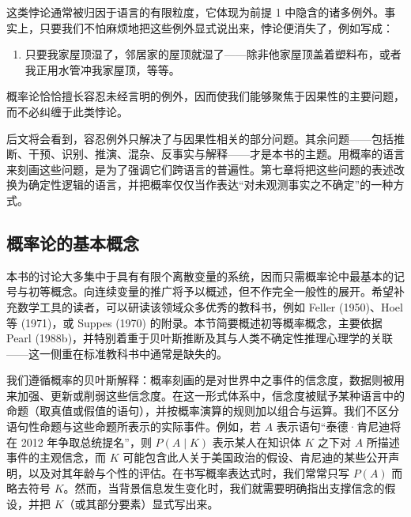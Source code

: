 这类悖论通常被归因于语言的有限粒度，它体现为前提 1 中隐含的诸多例外。事实上，只要我们不怕麻烦地把这些例外显式说出来，悖论便消失了，例如写成：

\begin{enumerate}[label=\arabic*$^{*}$.]
\item 只要我家屋顶湿了，邻居家的屋顶就湿了——除非他家屋顶盖着塑料布，或者我正用水管冲我家屋顶，等等。
\end{enumerate}

概率论恰恰擅长容忍未经言明的例外，因而使我们能够聚焦于因果性的主要问题，而不必纠缠于此类悖论。

后文将会看到，容忍例外只解决了与因果性相关的部分问题。其余问题——包括推断、干预、识别、推演、混杂、反事实与解释——才是本书的主题。用概率的语言来刻画这些问题，是为了强调它们跨语言的普遍性。第七章将把这些问题的表述改换为确定性逻辑的语言，并把概率仅仅当作表达“对未观测事实之不确定”的一种方式。

\subsection{概率论的基本概念}

本书的讨论大多集中于具有有限个离散变量的系统，因而只需概率论中最基本的记号与初等概念。向连续变量的推广将予以概述，但不作完全一般性的展开。希望补充数学工具的读者，可以研读该领域众多优秀的教科书，例如 Feller (1950)、Hoel 等 (1971)，或 Suppes (1970) 的附录。本节简要概述初等概率概念，主要依据 Pearl (1988b)，并特别着重于贝叶斯推断及其与人类不确定性推理心理学的关联——这一侧重在标准教科书中通常是缺失的。

我们遵循概率的贝叶斯解释：概率刻画的是对世界中之事件的信念度，数据则被用来加强、更新或削弱这些信念度。在这一形式体系中，信念度被赋予某种语言中的命题（取真值或假值的语句），并按概率演算的规则加以组合与运算。我们不区分语句性命题与这些命题所表示的实际事件。例如，若 $A$ 表示语句“泰德·肯尼迪将在 2012 年争取总统提名”，则 $P(A\mid K)$ 表示某人在知识体 $K$ 之下对 $A$ 所描述事件的主观信念，而 $K$ 可能包含此人关于美国政治的假设、肯尼迪的某些公开声明，以及对其年龄与个性的评估。在书写概率表达式时，我们常常只写 $P(A)$ 而略去符号 $K$。然而，当背景信息发生变化时，我们就需要明确指出支撑信念的假设，并把 $K$（或其部分要素）显式写出来。

